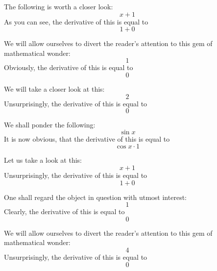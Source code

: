 \documentclass{article}
\begin{document}
The following is worth a closer look:
\begin{equation}
x + 1 
\end{equation}
As you can see, the derivative of this is equal to
\begin{equation}
1 + 0 
\end{equation}

We will allow ourselves to divert the reader's attention to this gem of mathematical wonder:
\begin{equation}
1 
\end{equation}
Obviously, the derivative of this is equal to
\begin{equation}
0 
\end{equation}

We will take a closer look at this:
\begin{equation}
2 
\end{equation}
Unsurprisingly, the derivative of this is equal to
\begin{equation}
0 
\end{equation}

We shall ponder the following:
\begin{equation}
\sin x 
\end{equation}
It is now obvious, that the derivative of this is equal to
\begin{equation}
\cos x \cdot 1 
\end{equation}

Let us take a look at this:
\begin{equation}
x + 1 
\end{equation}
Unsurprisingly, the derivative of this is equal to
\begin{equation}
1 + 0 
\end{equation}

One shall regard the object in question with utmost interest:
\begin{equation}
1 
\end{equation}
Clearly, the derivative of this is equal to
\begin{equation}
0 
\end{equation}

We will allow ourselves to divert the reader's attention to this gem of mathematical wonder:
\begin{equation}
4 
\end{equation}
Unsurprisingly, the derivative of this is equal to
\begin{equation}
0 
\end{equation}
\end{document}
